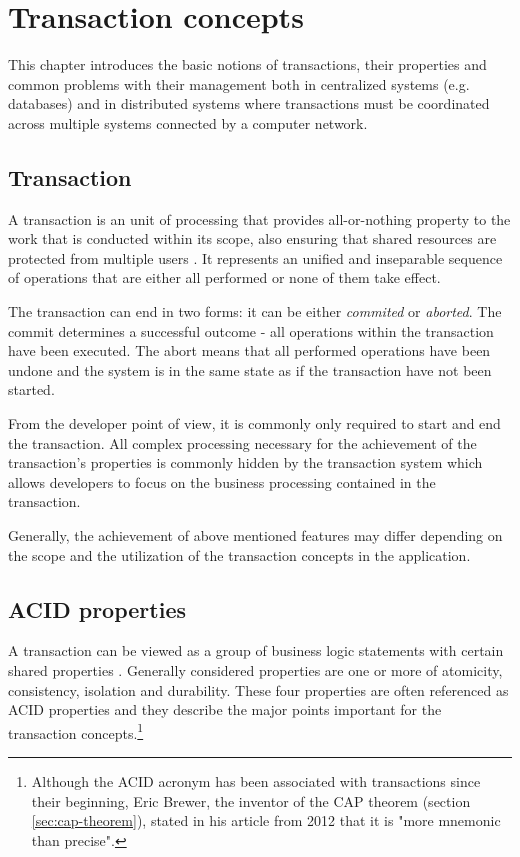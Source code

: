 \documentclass[oneside,
  digital, %
  table,   %
  lof,     %
  lot,     %
]{fithesis3}
\begin{document}
\clearpage
\chapter{Transaction concepts}

This chapter introduces the basic notions of transactions, their properties and common problems with their management both in centralized systems (e.g. databases) and in distributed systems where transactions must be coordinated across multiple systems connected by a computer network.

\section{Transaction}

A transaction is an unit of processing that provides all-or-nothing property to the work that is conducted within its scope, also ensuring that shared resources are protected from multiple users \cite{java_tran_processing}. It represents an unified and inseparable sequence of operations that are either all performed or none of them take effect. 

The transaction can end in two forms: it can be either \textit{commited} or \textit{aborted}. The commit determines a successful outcome - all operations within the transaction have been executed. The abort means that all performed operations have been undone and the system is in the same state as if the transaction have not been started.

From the developer point of view, it is commonly only required to start and end the transaction. All complex processing necessary for the achievement of the transaction's properties is commonly hidden by the transaction system \cite{java_tran_processing} which allows developers to focus on the business processing contained in the transaction.

Generally, the achievement of above mentioned features may differ depending on the scope and the utilization of the transaction concepts in the application.

\section{ACID properties}

A transaction can be viewed as a group of business logic statements with certain shared properties \cite{nar_wf}. Generally considered properties are one or more of atomicity, consistency, isolation and durability. These four properties are often referenced as ACID properties \cite{haerder_reuter_1983} and they describe the major points important for the transaction concepts.\footnote{Although the ACID acronym has been associated with transactions since their beginning, Eric Brewer, the inventor of the CAP theorem (section \ref{sec:cap-theorem}), stated in his article from 2012 that it is "more mnemonic than precise"\cite{cap_12years}.}
\end{document}
